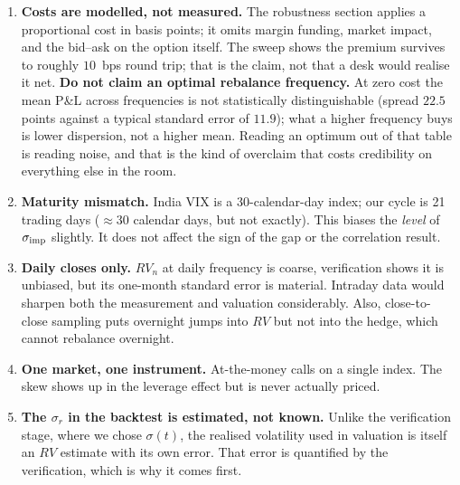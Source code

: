 \documentclass[11pt,a4paper]{article}
\begin{document}
\begin{enumerate}[leftmargin=*,topsep=1pt,itemsep=3pt]
      \smallskip
      \textbf{Two things bound the error.} $\si$ is the model-free index rather than
      Black--Scholes inverted at a single strike, so the volatility input is the market's and
      not ours; and an at-the-money call is exactly where the skew correction to a
      Black--Scholes premium is smallest. \textbf{The honest next version is the NSE option
      chain with its bid--ask}, volunteer that before he reaches for it.
\item \textbf{Costs are modelled, not measured.} The robustness section applies a proportional
      cost in basis points; it omits margin funding, market impact, and the bid--ask on the
      option itself. The sweep shows the premium survives to roughly $10$~bps round trip; that
      is the claim, not that a desk would realise it net. \textbf{Do not claim an optimal
      rebalance frequency.} At zero cost the mean P\&L across frequencies is not statistically
      distinguishable (spread $22.5$ points against a typical standard error of $11.9$); what a
      higher frequency buys is lower dispersion, not a higher mean. Reading an optimum out of
      that table is reading noise, and that is the kind of overclaim that costs credibility on
      everything else in the room.
\item \textbf{Maturity mismatch.} India VIX is a 30-calendar-day index; our cycle is 21
      trading days ($\approx$30 calendar days, but not exactly). This biases the \emph{level}
      of $\si$ slightly. It does not affect the sign of the gap or the correlation result.
\item \textbf{Daily closes only.} $RV_n$ at daily frequency is coarse, verification shows it is
      unbiased, but its one-month standard error is material. Intraday data would sharpen both
      the measurement and valuation considerably. Also, close-to-close sampling puts overnight jumps into $RV$ but
      not into the hedge, which cannot rebalance overnight.
\item \textbf{One market, one instrument.} At-the-money calls on a single index. The skew shows
      up in the leverage effect but is never actually priced.
\item \textbf{The $\sigma_r$ in the backtest is estimated, not known.} Unlike the verification
      stage, where we chose $\sigma(t)$, the realised volatility used in valuation is itself an
      $RV$ estimate with its own error. That error is quantified by the verification, which is
      why it comes first.
\end{enumerate}
\end{document}
